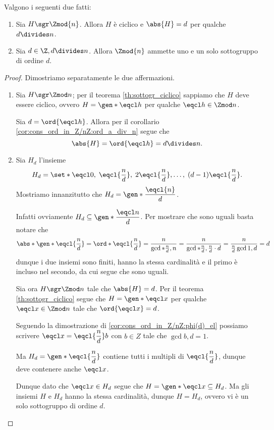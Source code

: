 \begin{proposition}
     \label{prop:sgr_Z/nZ}
    Valgono i seguenti due fatti:
    \begin{enumerate}[label={(\roman*)}, ref={\theproposition: (\roman*)}]
        \item \label{prop:sgr_Z/nZ:ciclico_ord_d} Sia $H \sgr \Zmod{n}$. Allora $H$ è ciclico e $\abs{H} = d$ per qualche $d \divides n$.
        \item \label{prop:sgr_Z/nZ:unosolo_ord_d} Sia $d \in \Z, d \divides n$. Allora $\Zmod{n}$ ammette uno e un solo sottogruppo di ordine $d$.
    \end{enumerate}
\end{proposition}
\begin{proof}
    Dimostriamo separatamente le due affermazioni.
    \begin{enumerate} [label={(\roman*)}]
        \item Sia $H \sgr \Zmod n$; per il teorema \ref{th:sottogr_ciclico} sappiamo che $H$ deve essere ciclico, ovvero $H = \gen*{\eqcl h}$ per qualche $\eqcl h \in \Zmod n$.
        
        Sia $d = \ord{\eqcl h}$. Allora per il corollario \ref{cor:cons_ord_in_Z/nZ:ord_a_div_n} segue che \[
            \abs{H} = \ord{\eqcl h} = d \divides n.   
        \]
        \item Sia $H_d$ l'insieme \[
            H_d = \set*{\eqcl 0,\; \eqcl{\frac{n}{d}},\; 2\eqcl{\frac{n}{d}}, \dots,\; (d-1)\eqcl{\frac{n}{d}}}.    
        \] Mostriamo innanzitutto che $H_d = \gen*{\dfrac{\eqcl{n}}{d}}$.
        
        Infatti ovviamente $H_d \subseteq \gen*{\dfrac{\eqcl n}{d}}$. Per mostrare che sono uguali basta notare che \[
            \abs*{\gen*{\eqcl{\frac{n}{d}}}} = 
            \ord*{\eqcl{\frac{n}{d}}} = 
            \frac{n}{\gcd*{\frac{n}{d}, n}} = 
            \frac{n}{\gcd*{\frac{n}{d}, \frac{n}{d} \cdot d}} = 
            \frac{n}{\frac{n}{d}\gcd{1, d}} = 
            d
        \] dunque i due insiemi sono finiti, hanno la stessa cardinalità e il primo è incluso nel secondo, da cui segue che sono uguali.

        Sia ora $H \sgr \Zmod n$ tale che $\abs{H} = d$. Per il teorema \ref{th:sottogr_ciclico} segue che $H = \gen*{\eqcl x}$ per qualche $\eqcl x \in \Zmod n$ tale che $\ord{\eqcl x} = d$.

        Seguendo la dimostrazione di \ref{cor:cons_ord_in_Z/nZ:phi(d)_el} possiamo scrivere $\eqcl x = \eqcl{\dfrac{n}{d}}b$ con $b \in Z$ tale che $\gcd{b, d} = 1$.

        Ma $H_d = \gen*{\eqcl{\dfrac{n}{d}}}$ contiene tutti i multipli di $\eqcl{\dfrac{n}{d}}$, dunque deve contenere anche $\eqcl x$.

        Dunque dato che $\eqcl x \in H_d$ segue che $H = \gen*{\eqcl x} \subseteq H_d$. Ma gli insiemi $H$ e $H_d$ hanno la stessa cardinalità, dunque $H = H_d$, ovvero vi è un solo sottogruppo di ordine $d$. \qedhere
    \end{enumerate}
\end{proof}
